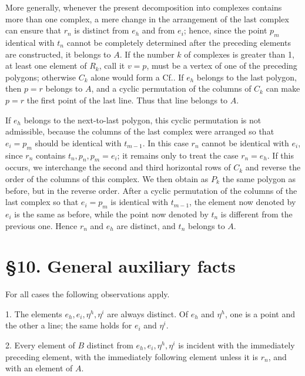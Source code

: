 \documentclass[11pt]{article}
\newcommand{\Cf}{\textup{Cf.}}
\begin{document}
More generally, whenever the present decomposition into complexes contains more than one complex, a mere change in the arrangement of the last complex can ensure that $r_n$ is distinct from $e_h$ and from $e_i$; hence, since the point $p_m$ identical with $t_n$ cannot be completely determined after the preceding elements are constructed, it belongs to $A$. If the number $k$ of complexes is greater than 1, at least one element of $R_k$, call it $v=p$, must be a vertex of one of the preceding polygons; otherwise $C_k$ alone would form a \Cf. If $e_h$ belongs to the last polygon, then $p=r$ belongs to $A$, and a cyclic permutation of the columns of $C_k$ can make $p=r$ the first point of the last line. Thus that line belongs to $A$.

If $e_h$ belongs to the next-to-last polygon, this cyclic permutation is not admissible, because the columns of the last complex were arranged so that $e_i=p_m$ should be identical with $t_{m-1}$. In this case $r_n$ cannot be identical with $e_i$, since $r_n$ contains $t_n,p_n,p_m=e_i$; it remains only to treat the case $r_n=e_h$. If this occurs, we interchange the second and third horizontal rows of $C_k$ and reverse the order of the columns of this complex. We then obtain as $P_k$ the same polygon as before, but in the reverse order. After a cyclic permutation of the columns of the last complex so that $e_i=p_m$ is identical with $t_{m-1}$, the element now denoted by $e_i$ is the same as before, while the point now denoted by $t_n$ is different from the previous one. Hence $r_n$ and $e_h$ are distinct, and $t_n$ belongs to $A$.

\section*{\S 10. General auxiliary facts}
For all cases the following observations apply.

1. The elements $e_h,e_i,\eta^h,\eta^i$ are always distinct. Of $e_h$ and $\eta^h$, one is a point and the other a line; the same holds for $e_i$ and $\eta^i$.

2. Every element of $B$ distinct from $e_h,e_i,\eta^h,\eta^i$ is incident with the immediately preceding element, with the immediately following element unless it is $r_n$, and with an element of $A$.
\end{document}
